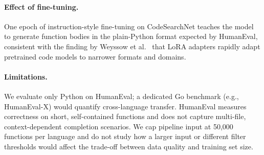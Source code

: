 \paragraph{Effect of fine-tuning.}
One epoch of instruction-style fine-tuning on CodeSearchNet teaches
the model to generate function bodies in the plain-Python format
expected by HumanEval, consistent with the finding by Weyssow et
al.~\cite{Weyssow2023PEFT} that LoRA adapters rapidly adapt pretrained
code models to narrower formats and domains.

\paragraph{Limitations.}
We evaluate only Python on HumanEval; a dedicated Go benchmark (e.g.,
HumanEval-X) would quantify cross-language transfer. HumanEval
measures correctness on short, self-contained functions and does not
capture multi-file, context-dependent completion scenarios. We cap
pipeline input at 50,000 functions per language and do not study how
a larger input or different filter thresholds would affect the
trade-off between data quality and training set size.
